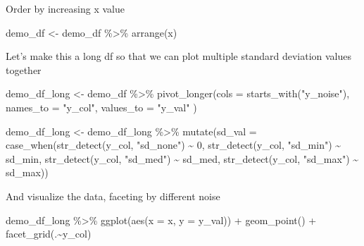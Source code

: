 \documentclass[
]{book}
\newenvironment{Shaded}{\begin{snugshade}}{\end{snugshade}}
\newcommand{\AttributeTok}[1]{\textcolor[rgb]{0.77,0.63,0.00}{#1}}
\newcommand{\DecValTok}[1]{\textcolor[rgb]{0.00,0.00,0.81}{#1}}
\newcommand{\FunctionTok}[1]{\textcolor[rgb]{0.00,0.00,0.00}{#1}}
\newcommand{\NormalTok}[1]{#1}
\newcommand{\OtherTok}[1]{\textcolor[rgb]{0.56,0.35,0.01}{#1}}
\newcommand{\SpecialCharTok}[1]{\textcolor[rgb]{0.00,0.00,0.00}{#1}}
\newcommand{\StringTok}[1]{\textcolor[rgb]{0.31,0.60,0.02}{#1}}
\begin{document}
Order by increasing x value

\begin{Shaded}
\begin{Highlighting}[]
\NormalTok{demo\_df }\OtherTok{\textless{}{-}}\NormalTok{ demo\_df }\SpecialCharTok{\%\textgreater{}\%} 
  \FunctionTok{arrange}\NormalTok{(x)}
\end{Highlighting}
\end{Shaded}

Let's make this a long df so that we can plot multiple standard deviation values together

\begin{Shaded}
\begin{Highlighting}[]
\NormalTok{demo\_df\_long }\OtherTok{\textless{}{-}}\NormalTok{ demo\_df }\SpecialCharTok{\%\textgreater{}\%} 
  \FunctionTok{pivot\_longer}\NormalTok{(}\AttributeTok{cols =} \FunctionTok{starts\_with}\NormalTok{(}\StringTok{"y\_noise"}\NormalTok{),}
               \AttributeTok{names\_to =} \StringTok{"y\_col"}\NormalTok{,}
               \AttributeTok{values\_to =} \StringTok{"y\_val"}
\NormalTok{  )}
\end{Highlighting}
\end{Shaded}

\begin{Shaded}
\begin{Highlighting}[]
\NormalTok{demo\_df\_long }\OtherTok{\textless{}{-}}\NormalTok{ demo\_df\_long }\SpecialCharTok{\%\textgreater{}\%} 
  \FunctionTok{mutate}\NormalTok{(}\AttributeTok{sd\_val =} \FunctionTok{case\_when}\NormalTok{(}\FunctionTok{str\_detect}\NormalTok{(y\_col, }\StringTok{"sd\_none"}\NormalTok{) }\SpecialCharTok{\textasciitilde{}} \DecValTok{0}\NormalTok{,}
                            \FunctionTok{str\_detect}\NormalTok{(y\_col, }\StringTok{"sd\_min"}\NormalTok{) }\SpecialCharTok{\textasciitilde{}}\NormalTok{ sd\_min,}
                            \FunctionTok{str\_detect}\NormalTok{(y\_col, }\StringTok{"sd\_med"}\NormalTok{) }\SpecialCharTok{\textasciitilde{}}\NormalTok{ sd\_med,}
                            \FunctionTok{str\_detect}\NormalTok{(y\_col, }\StringTok{"sd\_max"}\NormalTok{) }\SpecialCharTok{\textasciitilde{}}\NormalTok{ sd\_max))}
\end{Highlighting}
\end{Shaded}

And visualize the data, faceting by different noise

\begin{Shaded}
\begin{Highlighting}[]
\NormalTok{demo\_df\_long }\SpecialCharTok{\%\textgreater{}\%} 
  \FunctionTok{ggplot}\NormalTok{(}\FunctionTok{aes}\NormalTok{(}\AttributeTok{x =}\NormalTok{ x, }\AttributeTok{y =}\NormalTok{ y\_val)) }\SpecialCharTok{+}
  \FunctionTok{geom\_point}\NormalTok{() }\SpecialCharTok{+}
  \FunctionTok{facet\_grid}\NormalTok{(.}\SpecialCharTok{\textasciitilde{}}\NormalTok{y\_col)}
\end{Highlighting}
\end{Shaded}
\end{document}
